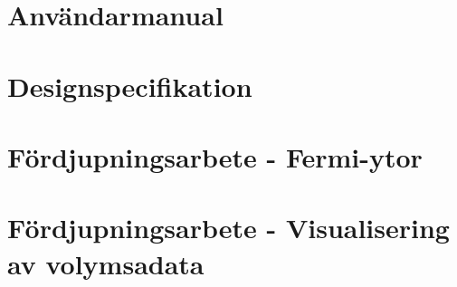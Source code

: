 \documentclass[a4paper,12pt,twoside,openright]{report}
\begin{document}
\begin{appendices}
	
\newpage

\chapter{Användarmanual}
\label{appendix:anvandarmanual}
\clearpage
\null
\newpage

% 

\chapter{Designspecifikation}
\label{appendix:designspecifikation}
\clearpage
\null
\newpage
	
% 
	
\chapter{Fördjupningsarbete - Fermi-ytor}
\label{appendix:fermi-ytor}
\clearpage
\null
\newpage

%
%

\chapter{Fördjupningsarbete - Visualisering av volymsadata}
\label{appendix:visualisering}
\clearpage
\null
\newpage

%
%


\end{appendices}
\end{document}
